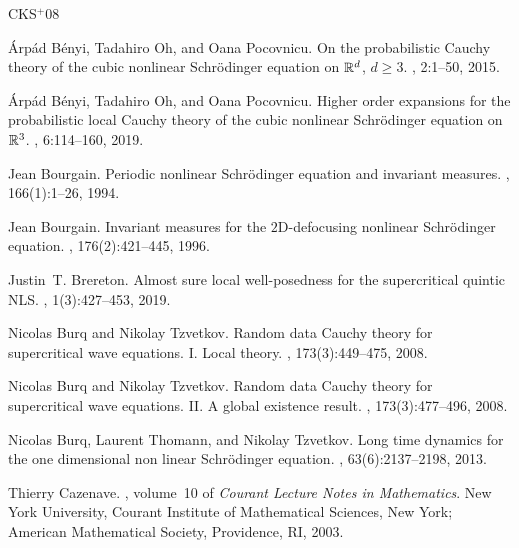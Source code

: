 \documentclass[10pt,leqno]{amsart}
\numberwithin{equation}{section}
\begin{document}

\newcommand{\etalchar}[1]{$^{#1}$}
\begin{thebibliography}{CKS{\etalchar{+}}08}

\'{A}rp\'{a}d B\'{e}nyi, Tadahiro Oh, and Oana Pocovnicu.
\newblock On the probabilistic {C}auchy theory of the cubic nonlinear
  {S}chr\"{o}dinger equation on {$\Bbb{R}^d$}, {$d\geq3$}.
, 2:1--50, 2015.

\'{A}rp\'{a}d B\'{e}nyi, Tadahiro Oh, and Oana Pocovnicu.
\newblock Higher order expansions for the probabilistic local {C}auchy theory
  of the cubic nonlinear {S}chr\"{o}dinger equation on {$\Bbb{R}^3$}.
, 6:114--160, 2019.

Jean Bourgain.
\newblock Periodic nonlinear {S}chr\"{o}dinger equation and invariant measures.
, 166(1):1--26, 1994.

Jean Bourgain.
\newblock Invariant measures for the {$2$}{D}-defocusing nonlinear
  {S}chr\"{o}dinger equation.
, 176(2):421--445, 1996.

Justin~T. Brereton.
\newblock Almost sure local well-posedness for the supercritical quintic {NLS}.
, 1(3):427--453, 2019.

Nicolas Burq and Nikolay Tzvetkov.
\newblock Random data {C}auchy theory for supercritical wave equations. {I}.
  {L}ocal theory.
, 173(3):449--475, 2008.

Nicolas Burq and Nikolay Tzvetkov.
\newblock Random data {C}auchy theory for supercritical wave equations. {II}.
  {A} global existence result.
, 173(3):477--496, 2008.

Nicolas Burq, Laurent Thomann, and Nikolay Tzvetkov.
\newblock Long time dynamics for the one dimensional non linear
  {S}chr\"{o}dinger equation.
, 63(6):2137--2198, 2013.

Thierry Cazenave.
, volume~10 of {\em
  Courant Lecture Notes in Mathematics}.
\newblock New York University, Courant Institute of Mathematical Sciences, New
  York; American Mathematical Society, Providence, RI, 2003.


\end{thebibliography}
\end{document}
